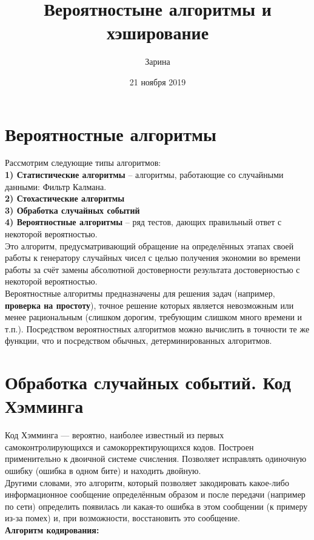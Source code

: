 \documentclass[a4paper,12pt]{article}
\author{Зарина}
\title{Вероятностыне алгоритмы и хэширование}
\date{21 ноября 2019}
\begin{document}
\section{Вероятностные алгоритмы}
Рассмотрим следующие типы алгоритмов:\\

\textbf{1) Статистические алгоритмы} -- алгоритмы, работающие со случайными данными: Фильтр Калмана.\\

\textbf{2) Стохастические алгоритмы}\\

\textbf{3) Обработка случайных событий}\\

\textbf{4) Вероятностные алгоритмы} -- ряд тестов, дающих правильный ответ с некоторой вероятностью.\\
Это алгоритм, предусматривающий обращение на определённых этапах своей работы к генератору случайных чисел с целью получения экономии во времени работы за счёт замены абсолютной достоверности результата достоверностью с некоторой вероятностью.\\
Вероятностные алгоритмы предназначены для решения задач (например, \textbf{проверка на простоту}), точное решение которых является невозможным или менее рациональным (слишком дорогим, требующим слишком много времени и т.п.). Посредством вероятностных алгоритмов можно вычислить в точности те же функции, что и посредством обычных, детерминированных алгоритмов.\\
\section{Обработка случайных событий. Код Хэмминга}
Код Хэмминга — вероятно, наиболее известный из первых самоконтролирующихся и самокорректирующихся кодов. Построен применительно к двоичной системе счисления. Позволяет исправлять одиночную ошибку (ошибка в одном бите) и находить двойную.\\

Другими словами, это алгоритм, который позволяет закодировать какое-либо информационное сообщение определённым образом и после передачи (например по сети) определить появилась ли какая-то ошибка в этом сообщении (к примеру из-за помех) и, при возможности, восстановить это сообщение. \\

\textbf{Алгоритм кодирования:}\\
\end{document}
